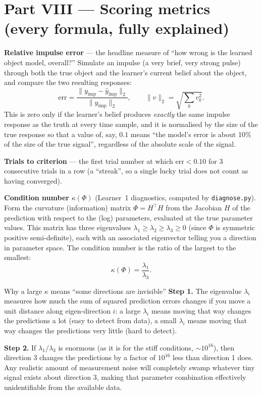 \documentclass[11pt,a4paper]{article}
\begin{document}
\section{Part VIII --- Scoring metrics (every formula, fully explained)}
\label{sec:metrics}

\textbf{Relative impulse error} --- the headline measure of ``how wrong is the
learned object model, overall?'' Simulate an impulse (a very brief, very
strong pulse) through both the true object and the learner's current belief
about the object, and compare the two resulting responses:
\begin{equation}
\mathrm{err} = \frac{\|y_{\mathrm{imp}}-\hat y_{\mathrm{imp}}\|_2}{\|y_{\mathrm{imp}}\|_2},
\qquad \|v\|_2 = \sqrt{\textstyle\sum_k v_k^2}.
\label{eq:imperr}
\end{equation}
This is zero only if the learner's belief produces \emph{exactly} the same
impulse response as the truth at every time sample, and it is normalised by
the size of the true response so that a value of, say, $0.1$ means ``the
model's error is about 10\% of the size of the true signal'', regardless of
the absolute scale of the signal.

\textbf{Trials to criterion} --- the first trial number at which
$\mathrm{err}<0.10$ for 3 consecutive trials in a row (a ``streak'', so a
single lucky trial does not count as having converged).

\textbf{Condition number} $\kappa(\Phi)$ (Learner~1 diagnostics, computed by
\texttt{diagnose.py}). Form the curvature (information) matrix
$\Phi=H^\top H$ from the Jacobian $H$ of the prediction with respect to the
(log) parameters, evaluated at the true parameter values. This matrix has
three eigenvalues $\lambda_1\ge\lambda_2\ge\lambda_3\ge0$ (since $\Phi$ is
symmetric positive semi-definite), each with an associated eigenvector
telling you a direction in parameter space. The condition number is the ratio
of the largest to the smallest:
\begin{equation}
\kappa(\Phi) = \frac{\lambda_1}{\lambda_3}.
\label{eq:kappa}
\end{equation}

\begin{stepbox}{Why a large $\kappa$ means ``some directions are invisible''}
\textbf{Step 1.} The eigenvalue $\lambda_i$ measures how much the sum of
squared prediction errors changes if you move a unit distance along
eigen-direction $i$: a large $\lambda_i$ means moving that way changes the
predictions a lot (easy to detect from data), a small $\lambda_i$ means moving
that way changes the predictions very little (hard to detect).

\textbf{Step 2.} If $\lambda_1/\lambda_3$ is enormous (as it is for the stiff
conditions, $\sim10^{16}$), then direction 3 changes the predictions by a
factor of $10^{16}$ less than direction 1 does. Any realistic amount of
measurement noise will completely swamp whatever tiny signal exists about
direction 3, making that parameter combination effectively unidentifiable
from the available data.
\end{stepbox}
\end{document}
